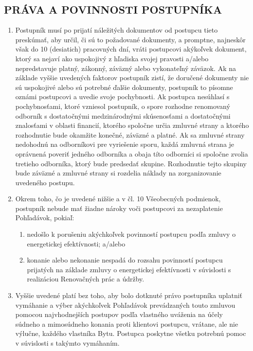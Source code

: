 \documentclass[a4paper]{article}
\begin{document}
\begin{multicols}{2}
\subsection{PRÁVA A POVINNOSTI POSTUPNÍKA}
\begin{enumerate}
    \item{Postupník musí po prijatí náležitých dokumentov od postupcu tieto preskúmať, aby určil, či sú to požadované dokumenty, a promptne, najneskôr však do 10 (desiatich) pracovných dní, vráti postupcovi akýkoľvek dokument, ktorý sa nejaví ako uspokojivý z hľadiska svojej pravosti a/alebo nepredstavuje platný, zákonný, záväzný alebo vykonateľný záväzok. Ak na základe vyššie uvedených faktorov postupník zistí, že doručené dokumenty nie sú uspokojivé alebo sú potrebné ďalšie dokumenty, postupník to písomne oznámi postupcovi a uvedie svoje pochybnosti. Ak postupca nesúhlasí s pochybnosťami, ktoré vzniesol postupník, o spore rozhodne renomovaný odborník s dostatočnými medzinárodnými skúsenosťami a dostatočnými znalosťami v oblasti financií, ktorého spoločne určia zmluvné strany a ktorého rozhodnutie bude okamžite konečné, záväzné a platné. Ak sa zmluvné strany nedohodnú na odborníkovi pre vyriešenie sporu, každá zmluvná strana je oprávnená poveriť jedného odborníka a obaja títo odborníci si spoločne zvolia tretieho odborníka, ktorý bude predsedať skupine. Rozhodnutie tejto skupiny bude záväzné a zmluvné strany si rozdelia náklady na zorganizovanie uvedeného postupu.}
    \item{Okrem toho, čo je uvedené nižšie a v čl. 10  Všeobecných podmienok, postupník nebude mať žiadne nároky voči postupcovi za nezaplatenie Pohľadávok, pokiaľ: }
    \begin{enumerate}
        \item{nedošlo k porušeniu akýchkoľvek povinností postupcu podľa zmluvy o energetickej efektívnosti; a/alebo}
        \item{konanie alebo nekonanie nespadá do rozsahu povinností postupcu prijatých na základe zmluvy o energetickej efektívnosti v súvislosti s realizáciou Renovačných prác a údržby.}
    \end{enumerate}
    \item{Vyššie uvedené platí bez toho, aby bolo dotknuté právo postupníka uplatniť vymáhanie a výber akýchkoľvek Pohľadávok prevádzaných touto zmluvou pomocou najvhodnejších postupov podľa vlastného uváženia na účely súdneho a mimosúdneho konania proti klientovi postupcu, vrátane, ale nie výlučne, každého vlastníka Bytu. Postupca poskytne všetku potrebnú pomoc v súvislosti s takýmto vymáhaním. }

\end{enumerate}
\end{multicols}
\end{document}
